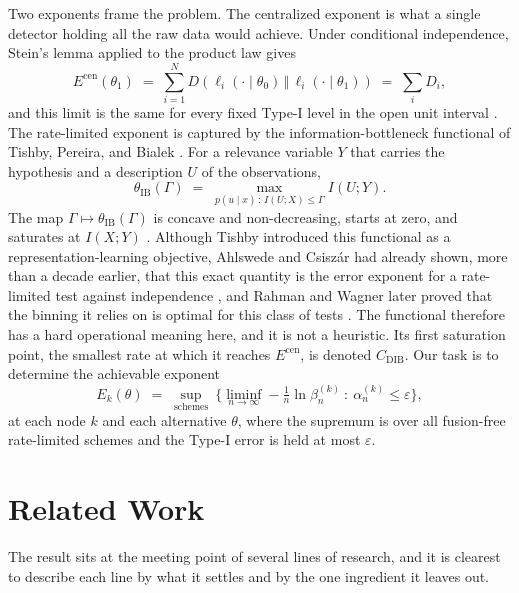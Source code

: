 \documentclass[journal]{IEEEtran}
\theoremstyle{definition}
\theoremstyle{remark}
\newcommand{\Ecen}{E^{\mathrm{cen}}}
\newcommand{\tib}{\theta_{\mathrm{IB}}}
\newcommand{\Cdib}{C_{\mathrm{DIB}}}
\newcommand{\KL}[2]{D\!\left(#1\,\Vert\,#2\right)}
\begin{document}
Two exponents frame the problem. The centralized exponent is what a single detector holding all the raw data
would achieve. Under conditional independence, Stein's lemma applied to the product law gives
\begin{equation}
\Ecen(\theta_1) \;=\; \sum_{i=1}^N \KL{\ell_i(\cdot\mid\theta_0)}{\ell_i(\cdot\mid\theta_1)} \;=\; \sum_i D_i,
\label{eq:ecen}
\end{equation}
and this limit is the same for every fixed Type-I level in the open unit interval
\cite{coverthomas2006,hankobayashi1989}. The rate-limited exponent is captured by the information-bottleneck
functional of Tishby, Pereira, and Bialek \cite{tishby1999}. For a relevance variable $Y$ that carries the
hypothesis and a description $U$ of the observations,
\begin{equation}
\tib(\Gamma) \;=\; \max_{p(u\mid x)\,:\,I(U;X)\le \Gamma} I(U;Y). \label{eq:tib}
\end{equation}
The map $\Gamma\mapsto\tib(\Gamma)$ is concave and non-decreasing, starts at zero, and saturates at $I(X;Y)$
\cite{giladbachrach2003}. Although Tishby introduced this functional as a representation-learning objective,
Ahlswede and Csisz\'ar had already shown, more than a decade earlier, that this exact quantity is the error
exponent for a rate-limited test against independence \cite{ahlswedecsiszar1986}, and Rahman and Wagner later
proved that the binning it relies on is optimal for this class of tests \cite{rahmanwagner2012}. The functional
therefore has a hard operational meaning here, and it is not a heuristic. Its first saturation point, the
smallest rate at which it reaches $\Ecen$, is denoted $\Cdib$. Our task is to determine the achievable exponent
\begin{equation}
E_k(\theta) \;=\; \sup_{\text{schemes}}\ \Big\{\liminf_{n\to\infty} -\tfrac1n\ln\beta_n^{(k)} \ :\
\alpha_n^{(k)}\le\varepsilon\Big\},
\label{eq:Ek}
\end{equation}
at each node $k$ and each alternative $\theta$, where the supremum is over all fusion-free rate-limited schemes
and the Type-I error is held at most $\varepsilon$.

\section{Related Work}\label{sec:related}
The result sits at the meeting point of several lines of research, and it is clearest to describe each line by
what it settles and by the one ingredient it leaves out.
\end{document}
